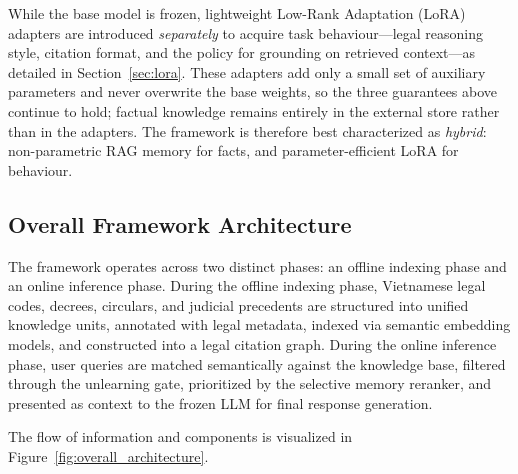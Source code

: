 While the base model is frozen, lightweight Low-Rank Adaptation (LoRA) adapters are introduced \emph{separately} to acquire task behaviour---legal reasoning style, citation format, and the policy for grounding on retrieved context---as detailed in Section~\ref{sec:lora}. These adapters add only a small set of auxiliary parameters and never overwrite the base weights, so the three guarantees above continue to hold; factual knowledge remains entirely in the external store rather than in the adapters. The framework is therefore best characterized as \emph{hybrid}: non-parametric RAG memory for facts, and parameter-efficient LoRA for behaviour.

\subsection{Overall Framework Architecture}
The framework operates across two distinct phases: an offline indexing phase and an online inference phase. During the offline indexing phase, Vietnamese legal codes, decrees, circulars, and judicial precedents are structured into unified knowledge units, annotated with legal metadata, indexed via semantic embedding models, and constructed into a legal citation graph. During the online inference phase, user queries are matched semantically against the knowledge base, filtered through the unlearning gate, prioritized by the selective memory reranker, and presented as context to the frozen LLM for final response generation.

The flow of information and components is visualized in Figure~\ref{fig:overall_architecture}.

